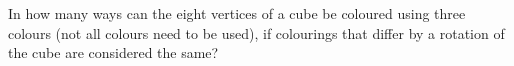In how many ways can the eight vertices of a cube be coloured using three colours (not all colours need to be used), if colourings that differ by a rotation of the cube are considered the same?
